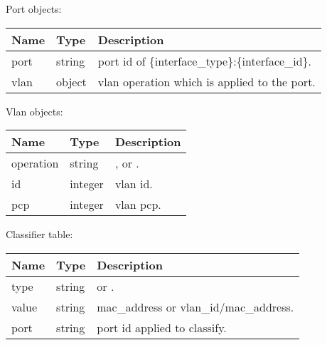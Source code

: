 \documentclass[a4paper,11pt,openany,oneside,english]{sphinxmanual}
\begin{document}
Port objects:


\begin{savenotes}\sphinxattablestart
\centering
{}
\sphinxthecaptionisattop
{}\label{\detokenize{api_ref/spp_vf:id22}}\label{\detokenize{api_ref/spp_vf:table-spp-ctl-spp-vf-res-port}}
\sphinxaftertopcaption
\begin{tabulary}{\linewidth}[t]{|T|T|T|}
\hline
\sphinxstyletheadfamily 
Name
&\sphinxstyletheadfamily 
Type
&\sphinxstyletheadfamily 
Description
\\
\hline
port
&
string
&
port id of \{interface\_type\}:\{interface\_id\}.
\\
\hline
vlan
&
object
&
vlan operation which is applied to the port.
\\
\hline
\end{tabulary}
\par
\sphinxattableend\end{savenotes}

Vlan objects:


\begin{savenotes}\sphinxattablestart
\centering
{}
\sphinxthecaptionisattop
{}\label{\detokenize{api_ref/spp_vf:id23}}\label{\detokenize{api_ref/spp_vf:table-spp-ctl-spp-vf-res-vlan}}
\sphinxaftertopcaption
\begin{tabulary}{\linewidth}[t]{|T|T|T|}
\hline
\sphinxstyletheadfamily 
Name
&\sphinxstyletheadfamily 
Type
&\sphinxstyletheadfamily 
Description
\\
\hline
operation
&
string
&
,  or .
\\
\hline
id
&
integer
&
vlan id.
\\
\hline
pcp
&
integer
&
vlan pcp.
\\
\hline
\end{tabulary}
\par
\sphinxattableend\end{savenotes}

Classifier table:


\begin{savenotes}\sphinxattablestart
\centering
{}
\sphinxthecaptionisattop
{}\label{\detokenize{api_ref/spp_vf:id24}}\label{\detokenize{api_ref/spp_vf:table-spp-ctl-spp-vf-res-cls}}
\sphinxaftertopcaption
\begin{tabulary}{\linewidth}[t]{|T|T|T|}
\hline
\sphinxstyletheadfamily 
Name
&\sphinxstyletheadfamily 
Type
&\sphinxstyletheadfamily 
Description
\\
\hline
type
&
string
&
 or .
\\
\hline
value
&
string
&
mac\_address or vlan\_id/mac\_address.
\\
\hline
port
&
string
&
port id applied to classify.
\\
\hline
\end{tabulary}
\par
\sphinxattableend\end{savenotes}
\end{document}
